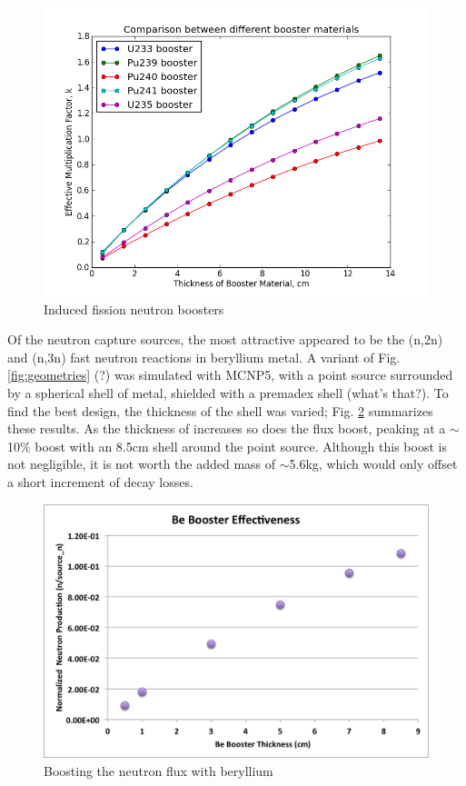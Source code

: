 \documentclass{mc2015}
\begin{document}
\begin{figure}[H]
  \centering
  \includegraphics[width=4.5in]{Boosters.png}
  \caption{Induced fission neutron boosters}
  \label{fig:boosters}
\end{figure}

Of the neutron capture sources, the most attractive appeared to be the (n,2n) and (n,3n) fast neutron reactions in beryllium metal. A variant of Fig. \ref{fig:geometries} (?) was simulated with MCNP5, with a  point source surrounded by a spherical shell of  metal, shielded with a premadex shell (what's that?).
To find the best design, the thickness of the  shell was varied; Fig. \ref{fig:beboosters} summarizes these results. As the thickness of  increases so does the flux boost, peaking at a $\sim$10\% boost with an 8.5cm shell around the point source. Although this boost is not negligible, it is not worth the added mass of $\sim$5.6kg, which would only offset a short increment of  decay losses. %

\begin{figure}[H]
  \centering
  \includegraphics[width=4.5in]{Be_boost.png}
  \caption{Boosting the neutron flux with beryllium}
  \label{fig:beboosters}
\end{figure}
\end{document}
